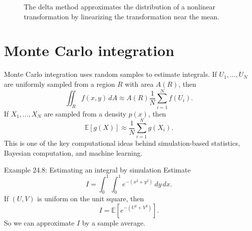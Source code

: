 \documentclass[11pt,oneside]{book}
\newcommand{\E}{\mathbb E}
\newcommand{\dd}{\,d}
\newcommand{\grad}{\nabla}
\begin{document}
\begin{figure}[H]
\centering
{}
\caption{The delta method approximates the distribution of a nonlinear transformation by linearizing the transformation near the mean.}
\end{figure}

\section{Monte Carlo integration}

Monte Carlo integration uses random samples to estimate integrals. If $U_1,\ldots,U_N$ are uniformly sampled from a region $R$ with area $A(R)$, then
\[
\iint_R f(x,y)\dd A\approx A(R)\frac1N\sum_{i=1}^N f(U_i).
\]
If $X_1,\ldots,X_N$ are sampled from a density $p(x)$, then
\[
\E[g(X)]\approx \frac1N\sum_{i=1}^N g(X_i).
\]
This is one of the key computational ideas behind simulation-based statistics, Bayesian computation, and machine learning.

\begin{examplebox}{Example 24.8: Estimating an integral by simulation}
Estimate
\[
I=\int_0^1\int_0^1 e^{-(x^2+y^2)}\dd y\dd x.
\]
If $(U,V)$ is uniform on the unit square, then
\[
I=\E[e^{-(U^2+V^2)}].
\]
So we can approximate $I$ by a sample average.
\end{examplebox}
\end{document}
